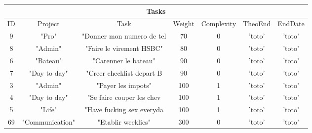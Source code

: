 \begin{longtable}{|c|c|c|c|c|c|c|}
\hline
\multicolumn{7}{|c|}{Tasks} \\
\hline
ID & Project & Task & Weight & Complexity & TheoEnd & EndDate\\
\hline
9 & "Pro" & "Donner mon numero de tel & 70 & 0 & 'toto' & 'toto'\\
\hline
8 & "Admin" & "Faire le virement HSBC" & 80 & 0 & 'toto' & 'toto'\\
\hline
6 & "Bateau" & "Carenner le bateau" & 90 & 0 & 'toto' & 'toto'\\
\hline
7 & "Day to day" & "Creer checklist depart B & 90 & 0 & 'toto' & 'toto'\\
\hline
3 & "Admin" & "Payer les impots" & 100 & 1 & 'toto' & 'toto'\\
\hline
4 & "Day to day" & "Se faire couper les chev & 100 & 1 & 'toto' & 'toto'\\
\hline
5 & "Life" & "Have fucking sex everyda & 100 & 1 & 'toto' & 'toto'\\
\hline
69 & "Communication" & "Etablir weeklies" & 300 & 0 & 'toto' & 'toto'\\
\hline
\end{longtable}
